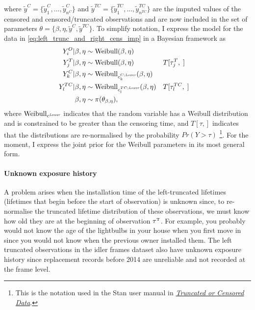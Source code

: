 where $\tilde{y}^C = \{\tilde{y}^C_1, \dots, \tilde{y}^C_{n^C}\}$ and $\tilde{y}^{TC} = \{\tilde{y}^{TC}_1, \dots, \tilde{y}^{TC}_{n^{TC}}\}$ are the imputed values of the censored and censored/truncated observations and are now included in the set of parameters $\theta = \{\beta, \eta, \tilde{y}^C, \tilde{y}^{TC}\}$. To simplify notation, I express the model for the data in \ref{eq:left_trunc_and_right_cens_imp} in a Bayesian framework as
\begin{align*}
    Y^O_i|\beta, \eta    & \sim \hbox{Weibull}(\beta, \eta) \\
    Y^T_j|\beta, \eta    & \sim \hbox{Weibull}(\beta, \eta) && T[\tau^T_j, \;]\\
    Y^C_k|\beta, \eta    & \sim \hbox{Weibull}_{c^{C;\textit{\tiny{Lower}}}_k}(\beta, \eta) \\
    Y^{TC}_l|\beta, \eta & \sim \hbox{Weibull}_{c^{TC;\textit{\tiny{Lower}}}_l}(\beta, \eta) && T[\tau^{TC}_l, \;] \\
    \beta, \eta & \sim \pi(\theta_{\beta, \eta}),
\end{align*}
where $\hbox{Weibull}_{c^{\textit{\tiny{Lower}}}}$ indicates that the random variable has a Weibull distribution and is constrained to be greater than the censoring time, and $T[\tau, ]$ indicates that the distributions are re-normalised by the probability $Pr(Y > \tau)$ \citep{Stan2022} \footnote{This is the notation used in the Stan user manual in \href{https://mc-stan.org/docs/stan-users-guide/truncation-censoring.html}{\textit{Truncated or Censored Data}}.}. For the moment, I express the joint prior for the Weibull parameters in its most general form.

\paragraph{Unknown exposure history}

A problem arises when the installation time of the left-truncated lifetimes (lifetimes that begin before the start of observation) is unknown since, to re-normalise the truncated lifetime distribution of these observations, we must know how old they are at the beginning of observation $\tau^{\hbox{\tiny{T}}}$. For example, you probably would not know the age of the lightbulbs in your house when you first move in since you would not know when the previous owner installed them. The left truncated observations in the idler frames dataset also have unknown exposure history since replacement records before 2014 are unreliable and not recorded at the frame level.

